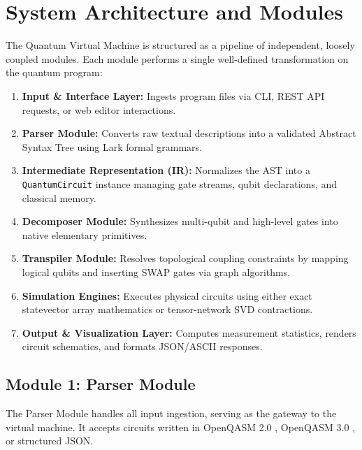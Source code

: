 
\section{System Architecture and Modules}

The Quantum Virtual Machine is structured as a pipeline of independent, loosely coupled modules. Each module performs a single well-defined transformation on the quantum program:

\begin{enumerate}[leftmargin=*]
    \item \textbf{Input & Interface Layer:} Ingests program files via CLI, REST API requests, or web editor interactions.
    \item \textbf{Parser Module:} Converts raw textual descriptions into a validated Abstract Syntax Tree using Lark formal grammars.
    \item \textbf{Intermediate Representation (IR):} Normalizes the AST into a \texttt{QuantumCircuit} instance managing gate streams, qubit declarations, and classical memory.
    \item \textbf{Decomposer Module:} Synthesizes multi-qubit and high-level gates into native elementary primitives.
    \item \textbf{Transpiler Module:} Resolves topological coupling constraints by mapping logical qubits and inserting SWAP gates via graph algorithms.
    \item \textbf{Simulation Engines:} Executes physical circuits using either exact statevector array mathematics or tensor-network SVD contractions.
    \item \textbf{Output & Visualization Layer:} Computes measurement statistics, renders circuit schematics, and formats JSON/ASCII responses.
\end{enumerate}


\subsection{Module 1: Parser Module}

The Parser Module handles all input ingestion, serving as the gateway to the virtual machine. It accepts circuits written in OpenQASM 2.0 \cite{cross2017qasm}, OpenQASM 3.0 \cite{cross2022qasm3}, or structured JSON.

